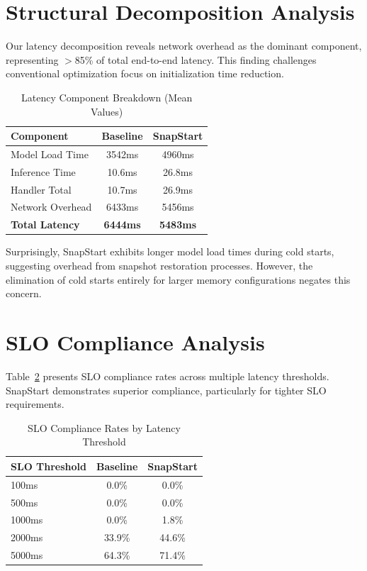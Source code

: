\documentclass[conference]{IEEEtran}
\begin{document}
\section{Structural Decomposition Analysis}

Our latency decomposition reveals network overhead as the dominant component, representing \(>\)85\% of total end-to-end latency. This finding challenges conventional optimization focus on initialization time reduction.

\begin{table}[t]
\caption{Latency Component Breakdown (Mean Values)}
\label{tab:latency_decomposition}
\centering
\begin{tabular}{lcc}
\toprule
\textbf{Component} & \textbf{Baseline} & \textbf{SnapStart} \\
\midrule
Model Load Time & 3542ms & 4960ms \\
Inference Time & 10.6ms & 26.8ms \\
Handler Total & 10.7ms & 26.9ms \\
Network Overhead & 6433ms & 5456ms \\
\textbf{Total Latency} & \textbf{6444ms} & \textbf{5483ms} \\
\bottomrule
\end{tabular}
\end{table}

Surprisingly, SnapStart exhibits longer model load times during cold starts, suggesting overhead from snapshot restoration processes. However, the elimination of cold starts entirely for larger memory configurations negates this concern.

\section{SLO Compliance Analysis}

Table~\ref{tab:slo_analysis} presents SLO compliance rates across multiple latency thresholds. SnapStart demonstrates superior compliance, particularly for tighter SLO requirements.

\begin{table}[t]
\caption{SLO Compliance Rates by Latency Threshold}
\label{tab:slo_analysis}
\centering
\begin{tabular}{lcc}
\toprule
\textbf{SLO Threshold} & \textbf{Baseline} & \textbf{SnapStart} \\
\midrule
100ms & 0.0\% & 0.0\% \\
500ms & 0.0\% & 0.0\% \\
1000ms & 0.0\% & 1.8\% \\
2000ms & 33.9\% & 44.6\% \\
5000ms & 64.3\% & 71.4\% \\
\bottomrule
\end{tabular}
\end{table}
\end{document}
